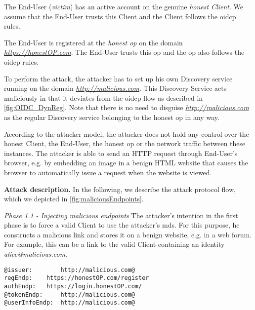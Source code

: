 \documentclass[conference,compsoc]{IEEEtran}
\renewenvironment{itemize}{\begin{compactitem}}{\end{compactitem}}
\renewcommand*{\paragraph}[1]{\vspace{2mm}\noindent\textbf{#1.}}
\begin{document}
\begin{itemize}
\item The End-User (\emph{victim}) has an active account on the genuine \emph{honest Client}.
We assume that the End-User trusts this Client and the Client follows the \gls{oidcp} rules.

\item The End-User is registered at the \emph{honest \gls{op}} on the domain \emph{\url{https://honestOP.com}}.
The End-User trusts this \gls{op} and the \gls{op} also follows the \gls{oidcp} rules.

\item To perform the attack, the attacker has to set up his own Discovery service running on the domain \emph{\url{http://malicious.com}}.
This Discovery Service acts maliciously in that it deviates from the \gls{oidcp} flow as described in \autoref{fig:OIDC_DynReg}.
Note that there is no need to disguise \emph{\url{http://malicious.com}} as the regular Discovery service belonging to the honest \gls{op} in any way.

\item According to the attacker model, the attacker does not hold any control over the honest Client, the End-User, the honest \gls{op} or the network traffic between these instances.
The attacker is able to send an HTTP request through End-User's browser, e.g. by embedding an image in a benign HTML website that causes the browser to automatically issue a request when the website is viewed.

\end{itemize}



\paragraph{Attack description}
In the following, we describe the attack protocol flow, which we depicted in \autoref{fig:maliciousEndpoints}.

\emph{Phase 1.1 - Injecting malicious endpoints}
The attacker's intention in the first phase is to force a valid Client to use the attacker's \gls{mds}.
For this purpose, he constructs a malicious link and stores it on a benign website, e.g. in a web forum.
For example, this can be a link to the valid Client containing an identity \emph{alice@malicious.com}.

\begin{lstlisting}[frame=shadowbox,xrightmargin=1.1em,caption={Endpoints returned by the \gls{mds}},label=lst:maliciousEndpoints,style=base]
@issuer:    	http://malicious.com@
regEndp:   	https://honestOP.com/register
authEndp:  	https://login.honestOP.com/
@tokenEndp: 	http://malicious.com@
@userInfoEndp:	http://malicious.com@
\end{lstlisting}
\end{document}
